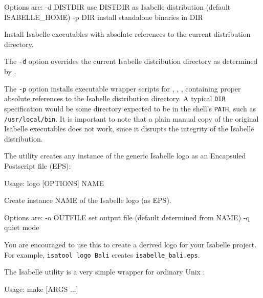 \begin{isabellebody}
\begin{isamarkuptext}
\begin{ttbox}
  Options are:
    -d DISTDIR   use DISTDIR as Isabelle distribution
                 (default ISABELLE_HOME)
    -p DIR       install standalone binaries in DIR

  Install Isabelle executables with absolute references to the current
  distribution directory.
\end{ttbox}

  The \verb|-d| option overrides the current Isabelle
  distribution directory as determined by \hyperlink{setting.ISABELLE-HOME}{\mbox{}}.

  The \verb|-p| option installs executable wrapper scripts for
  \hyperlink{executable.isabelle}{\mbox{}}, \hyperlink{executable.isatool}{\mbox{}}, \hyperlink{executable.Isabelle}{\mbox{}}, containing proper absolute references to the Isabelle
  distribution directory.  A typical \verb|DIR| specification
  would be some directory expected to be in the shell's \verb|PATH|, such as \verb|/usr/local/bin|.  It is important to
  note that a plain manual copy of the original Isabelle executables
  does not work, since it disrupts the integrity of the Isabelle
  distribution.%
\end{isamarkuptext}%
\isamarkuptrue%
%
\isamarkuptrue%
%
\begin{isamarkuptext}%
The \hypertarget{tool.logo}{\hyperlink{tool.logo}{\mbox{}}} utility creates any instance of the generic
  Isabelle logo as an Encapsuled Postscript file (EPS):
\begin{ttbox}
Usage: logo [OPTIONS] NAME

  Create instance NAME of the Isabelle logo (as EPS).

  Options are:
    -o OUTFILE   set output file (default determined from NAME)
    -q           quiet mode
\end{ttbox}
  You are encouraged to use this to create a derived logo for your
  Isabelle project.  For example, \verb|isatool logo Bali|
  creates \verb|isabelle_bali.eps|.%
\end{isamarkuptext}%
\isamarkuptrue%
%
\isamarkuptrue%
%
\begin{isamarkuptext}%
The Isabelle \hypertarget{tool.make}{\hyperlink{tool.make}{\mbox{}}} utility is a very simple wrapper for
  ordinary Unix \hyperlink{executable.make}{\mbox{}}:
\begin{ttbox}
Usage: make [ARGS ...]


\end{ttbox}
\end{isamarkuptext}
\end{isabellebody}
